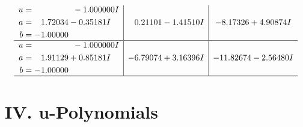 \documentclass[1p]{elsarticle_modified}
\theoremstyle{definition}
\begin{document}
$$\begin{array}{c|c|c}
\begin{aligned}
u &= \phantom{-0.000000 } -1.000000 I \\
a &= \phantom{-}1.72034 - 0.35181 I \\
b &= -1.00000\phantom{ +0.000000I}\end{aligned}
 & \phantom{-}0.21101 - 1.41510 I & -8.17326 + 4.90874 I \\ \hline\begin{aligned}
u &= \phantom{-0.000000 } -1.000000 I \\
a &= \phantom{-}1.91129 + 0.85181 I \\
b &= -1.00000\phantom{ +0.000000I}\end{aligned}
 & -6.79074 + 3.16396 I & -11.82674 - 2.56480 I\\
 \hline 
 \end{array}$$\newpage
\newpage\renewcommand{\arraystretch}{1}
\centering \section*{ IV. u-Polynomials}
\end{document}

